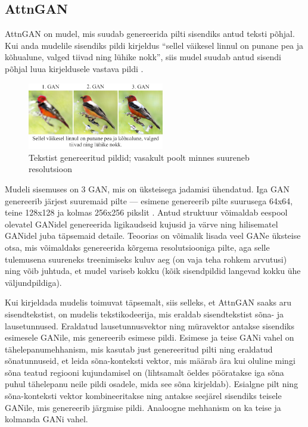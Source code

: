 \documentclass{vilgym}
\begin{document}
	\subsection{AttnGAN}

	AttnGAN on mudel, mis suudab genereerida pilti sisendiks antud teksti põhjal. Kui anda mudelile sisendiks pildi kirjeldus \enquote{sellel väikesel linnul on punane pea ja kõhualune, valged tiivad ning lühike nokk}, siis mudel suudab antud sisendi põhjal luua kirjeldusele vastava pildi .
	
	\begin{figure}
		\includegraphics[width=0.53\textwidth]{images/attngan.png}
		\caption{Tekstist genereeritud pildid; vasakult poolt minnes suureneb resolutsioon}
		\label{fig:attngan}
	\end{figure}

	Mudeli sisemuses on 3 GAN, mis on üksteisega jadamisi ühendatud. Iga GAN genereerib järjest suuremaid pilte --- esimene genereerib pilte suurusega 64x64, teine 128x128 ja kolmas 256x256 pikslit . Antud struktuur võimaldab eespool olevatel GANidel genereerida ligikaudseid kujusid ja värve ning hilisematel GANidel juba täpsemaid detaile. Teoorias on võimalik lisada veel GANe üksteise otsa, mis võimaldaks genereerida kõrgema resolutsiooniga pilte, aga selle tulemusena suureneks treenimiseks kuluv aeg (on vaja teha rohkem arvutusi) ning võib juhtuda, et mudel variseb kokku (kõik sisendpildid langevad kokku ühe väljundpildiga).

	Kui kirjeldada mudelis toimuvat täpsemalt, siis selleks, et AttnGAN saaks aru sisendtekstist, on mudelis tekstikodeerija, mis eraldab sisendtekstist sõna- ja lausetunnused. Eraldatud lausetunnusvektor ning müravektor antakse sisendiks esimesele GANile, mis genereerib esimese pildi. Esimese ja teise GANi vahel on tähelepanumehhanism, mis kasutab just genereeritud pilti ning eraldatud sõnatunnuseid, et leida sõna-konteksti vektor, mis määrab ära kui oluline mingi sõna teatud regiooni kujundamisel on (lihtsamalt öeldes pööratakse iga sõna puhul tähelepanu neile pildi osadele, mida see sõna kirjeldab). Esialgne pilt ning sõna-konteksti vektor kombineeritakse ning antakse seejärel sisendiks teisele GANile, mis genereerib järgmise pildi. Analoogne mehhanism on ka teise ja kolmanda GANi vahel.
\end{document}
